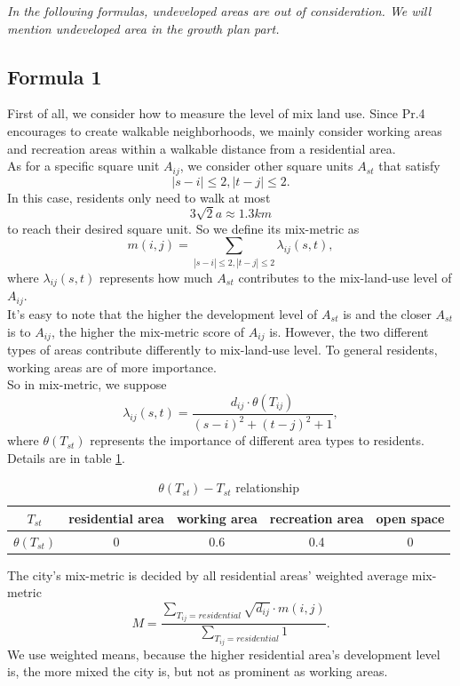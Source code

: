 \emph{In the following formulas, undeveloped areas are out of consideration. We will mention undeveloped area in the growth plan part.}\\

\subsection{Formula 1}
First of all, we consider how to measure the level of mix land use.
Since Pr.4 encourages to create walkable neighborhoods, we mainly consider working areas and recreation areas within a walkable distance from a residential area.\\

As for a specific square unit $ A_{ij} $, we consider other square units $ A_{st}$ that satisfy $$ |s-i| \leq 2, |t-j| \leq 2. $$
In this case, residents only need to walk at most $$ 3 \sqrt{2} a \approx 1.3km $$ to reach their desired square unit.
So we define its mix-metric as $$ m(i,j) = \sum_{|s-i| \leq 2, |t-j| \leq 2} \lambda_{ij}(s,t), $$ where $ \lambda_{ij}(s,t) $ represents how much $ A_{st} $ contributes to the mix-land-use level of $ A_{ij} $.\\

It's easy to note that the higher the development level of $ A_{st} $ is and the closer $ A_{st} $ is to $ A_{ij} $, the higher the mix-metric score of $ A_{ij} $ is.
However, the two different types of areas contribute differently to mix-land-use level.
To general residents, working areas are of more importance.\\

So in mix-metric, we suppose $$ \lambda_{ij}(s,t) = \frac{d_{ij} \cdot \theta (T_{ij})}{(s-i)^2 + (t-j)^2 + 1}, $$ where $ \theta (T_{st}) $ represents the importance of different area types to residents. Details are in table \ref{tab:formula-1}.\\
\begin{table}[t]
\centering
  \begin{tabular}{c|cccc}
    \hline
    $ T_{st} $ & residential area & working area & recreation area & open space \\
    \hline
    $ \theta (T_{st}) $ & 0 & 0.6 & 0.4 & 0 \\
    \hline
  \end{tabular}
  \caption{$ \theta (T_{st}) - T_{st} $ relationship}
  \label{tab:formula-1}
\end{table}

The city's mix-metric is decided by all residential areas' weighted average mix-metric $$ M=\frac{\sum_{T_{ij}=residential} \sqrt{d_{ij}} \cdot m(i,j)}{\sum_{T_{ij}=residential} 1}. $$
We use weighted means, because the higher residential area's development level is, the more mixed the city is, but not as prominent as working areas.\\

